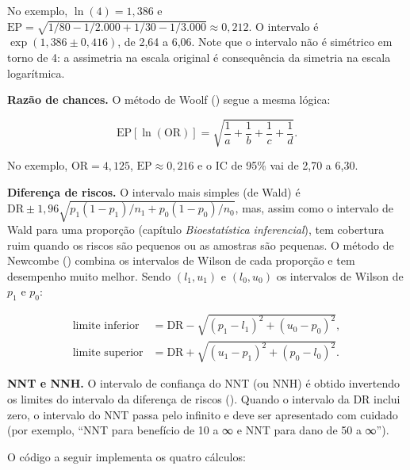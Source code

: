 \documentclass[
]{book}
\begin{document}
No exemplo, \(\ln(4) = 1{,}386\) e \(\text{EP} = \sqrt{1/80 - 1/2.000 + 1/30 - 1/3.000} \approx 0{,}212\). O intervalo é \(\exp(1{,}386 \pm 0{,}416)\), de 2,64 a 6,06. Note que o intervalo não é simétrico em torno de 4: a assimetria na escala original é consequência da simetria na escala logarítmica.

\textbf{Razão de chances.} O método de Woolf () segue a mesma lógica:

\[
\text{EP}[\ln(\text{OR})] = \sqrt{\frac{1}{a} + \frac{1}{b} + \frac{1}{c} + \frac{1}{d}} .
\]

No exemplo, \(\text{OR} = 4{,}125\), \(\text{EP} \approx 0{,}216\) e o IC de 95\% vai de 2,70 a 6,30.

\textbf{Diferença de riscos.} O intervalo mais simples (de Wald) é \(\text{DR} \pm 1{,}96\sqrt{p_1(1-p_1)/n_1 + p_0(1-p_0)/n_0}\), mas, assim como o intervalo de Wald para uma proporção (capítulo \emph{Bioestatística inferencial}), tem cobertura ruim quando os riscos são pequenos ou as amostras são pequenas. O método de Newcombe () combina os intervalos de Wilson de cada proporção e tem desempenho muito melhor. Sendo \((l_1, u_1)\) e \((l_0, u_0)\) os intervalos de Wilson de \(p_1\) e \(p_0\):

\[
\begin{aligned}
\text{limite inferior} &= \text{DR} - \sqrt{(p_1 - l_1)^2 + (u_0 - p_0)^2}, \\
\text{limite superior} &= \text{DR} + \sqrt{(u_1 - p_1)^2 + (p_0 - l_0)^2}.
\end{aligned}
\]

\textbf{NNT e NNH.} O intervalo de confiança do NNT (ou NNH) é obtido invertendo os limites do intervalo da diferença de riscos (). Quando o intervalo da DR inclui zero, o intervalo do NNT passa pelo infinito e deve ser apresentado com cuidado (por exemplo, ``NNT para benefício de 10 a ∞ e NNT para dano de 50 a ∞'').

O código a seguir implementa os quatro cálculos:
\end{document}
